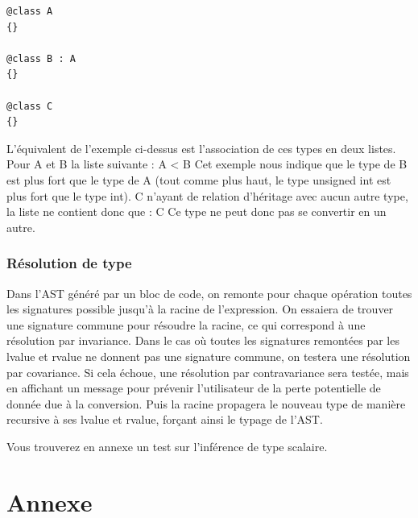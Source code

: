 \documentclass[12pt,a4paper]{article}
\begin{document}
\begin{NoHyper}
\begin{lstlisting}
@class A
{}

@class B : A
{}

@class C
{}
\end{lstlisting}
L’équivalent de l’exemple ci-dessus est l’association de ces types en deux listes.
Pour A et B la liste suivante : A < B\newline
Cet exemple nous indique que le type de B est plus fort que le type de A (tout comme plus haut, le type unsigned int est plus fort que le type int).\newline
C n’ayant de relation d’héritage avec aucun autre type, la liste ne contient donc que : C\newline
Ce type ne peut donc pas se convertir en un autre.\newline
\newline

\subsubsection{Résolution de type}
Dans l'AST généré par un bloc de code, on remonte pour chaque opération toutes les signatures possible jusqu'à la racine de l'expression. On essaiera de trouver une signature commune pour résoudre la racine, ce qui correspond à une résolution par invariance. Dans le cas où toutes les signatures remontées par les lvalue et rvalue ne donnent pas une signature commune, on testera une résolution par covariance. Si cela échoue, une résolution par contravariance sera testée, mais en affichant un message pour prévenir l'utilisateur de la perte potentielle de donnée due à la conversion. Puis la racine propagera le nouveau type de manière recursive à ses lvalue et rvalue, forçant ainsi le typage de l'AST.



Vous trouverez en annexe un test sur l'inférence de type scalaire.


\section{Annexe}

\end{NoHyper}
\end{document}

